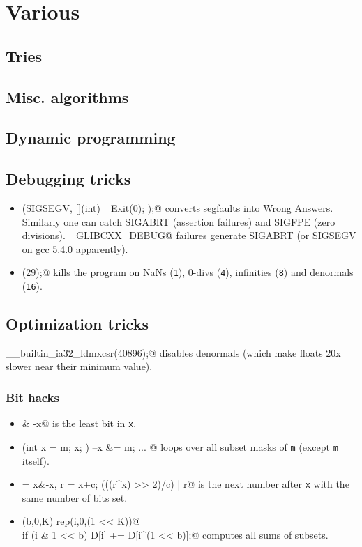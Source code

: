 \chapter{Various}

\section{Tries}

\section{Misc. algorithms}

\section{Dynamic programming}

\section{Debugging tricks}
	\begin{itemize}
		\item \verb@signal(SIGSEGV, [](int) { _Exit(0); });@ converts segfaults into Wrong Answers.
			Similarly one can catch SIGABRT (assertion failures) and SIGFPE (zero divisions).
			\verb@_GLIBCXX_DEBUG@ failures generate SIGABRT (or SIGSEGV on gcc 5.4.0 apparently).
		\item \verb@feenableexcept(29);@ kills the program on NaNs (\texttt 1), 0-divs (\texttt 4), infinities (\texttt 8) and denormals (\texttt{16}).
	\end{itemize}

\section{Optimization tricks}
	\verb@__builtin_ia32_ldmxcsr(40896);@ disables denormals (which make floats 20x slower near their minimum value).
	\subsection{Bit hacks}
		\begin{itemize}
			\item \verb@x & -x@ is the least bit in \texttt{x}.
			\item \verb@for (int x = m; x; ) { --x &= m; ... }@ loops over all subset masks of \texttt{m} (except \texttt{m} itself).
			\item \verb@c = x&-x, r = x+c; (((r^x) >> 2)/c) | r@ is the next number after \texttt{x} with the same number of bits set.
			\item \verb@rep(b,0,K) rep(i,0,(1 << K))@ \\ \verb@  if (i & 1 << b) D[i] += D[i^(1 << b)];@ computes all sums of subsets.
		\end{itemize}
